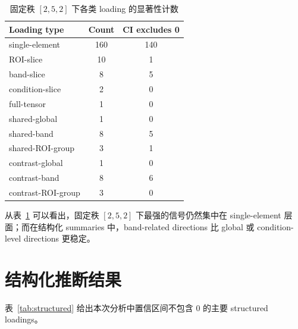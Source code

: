 \documentclass[11pt]{ctexart}
\begin{document}
\begin{table}[H]
\centering
\caption{固定秩 $[2,5,2]$ 下各类 loading 的显著性计数}
\label{tab:count}
\begin{tabular}{lcc}
\toprule
Loading type & Count & CI excludes 0 \\
\midrule
single-element & 160 & 140 \\
ROI-slice & 10 & 1 \\
band-slice & 8 & 5 \\
condition-slice & 2 & 0 \\
full-tensor & 1 & 0 \\
shared-global & 1 & 0 \\
shared-band & 8 & 5 \\
shared-ROI-group & 3 & 1 \\
contrast-global & 1 & 0 \\
contrast-band & 8 & 6 \\
contrast-ROI-group & 3 & 0 \\
\bottomrule
\end{tabular}
\end{table}

从表~\ref{tab:count} 可以看出，固定秩 $[2,5,2]$ 下最强的信号仍然集中在 single-element 层面；而在结构化 summaries 中，band-related directions 比 global 或 condition-level directions 更稳定。

\section{结构化推断结果}
表~\ref{tab:structured} 给出本次分析中置信区间不包含 $0$ 的主要 structured loadings。
\end{document}
